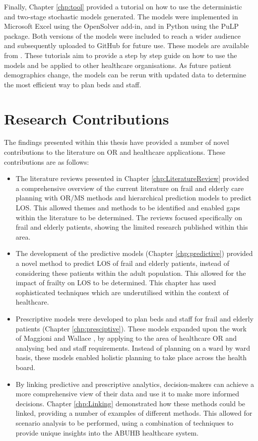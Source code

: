 \documentclass[../thesis.tex]{subfiles}
\begin{document}
Finally, Chapter \ref{chp:tool} provided a tutorial on how to use the deterministic and two-stage stochastic models generated. The models were implemented in Microsoft Excel using the OpenSolver add-in, and in Python using the PuLP package. Both versions of the models were included to reach a wider audience and subsequently uploaded to GitHub for future use. These models are available from \cite{Williams2023}. These tutorials aim to provide a step by step guide on how to use the models and be applied to other healthcare organisations. As future patient demographics change, the models can be rerun with updated data to determine the most efficient way to plan beds and staff.

\section{Research Contributions}
The findings presented within this thesis have provided a number of novel contributions to the literature on OR and healthcare applications. These contributions are as follows:

\begin{itemize}
    \item The literature reviews presented in Chapter \ref{chp:LiteratureReview} provided a comprehensive overview of the current literature on frail and elderly care planning with OR/MS methods and hierarchical prediction models to predict LOS. This allowed themes and methods to be identified and enabled gaps within the literature to be determined. The reviews focused specifically on frail and elderly patients, showing the limited research published within this area.
    \item The development of the predictive models (Chapter \ref{chp:predictive}) provided a novel method to predict LOS of frail and elderly patients, instead of considering these patients within the adult population. This allowed for the impact of frailty on LOS to be determined. This chapter has used sophisticated techniques which are underutilised within the context of healthcare.
    \item Prescriptive models were developed to plan beds and staff for frail and elderly patients (Chapter \ref{chp:presciptive}). These models expanded upon the work of Maggioni and Wallace \cite{Maggioni2010}, by applying to the area of healthcare OR and analysing bed and staff requirements.
    Instead of planning on a ward by ward basis, these models enabled holistic planning to take place across the health board.
    \item By linking predictive and prescriptive analytics, decision-makers can achieve a more comprehensive view of their data and use it to make more informed decisions. Chapter \ref{chp:Linking} demonstrated how these methods could be linked, providing a number of examples of different methods. This allowed for scenario analysis to be performed, using a combination of techniques to provide unique insights into the ABUHB healthcare system.
\end{itemize}
\end{document}
